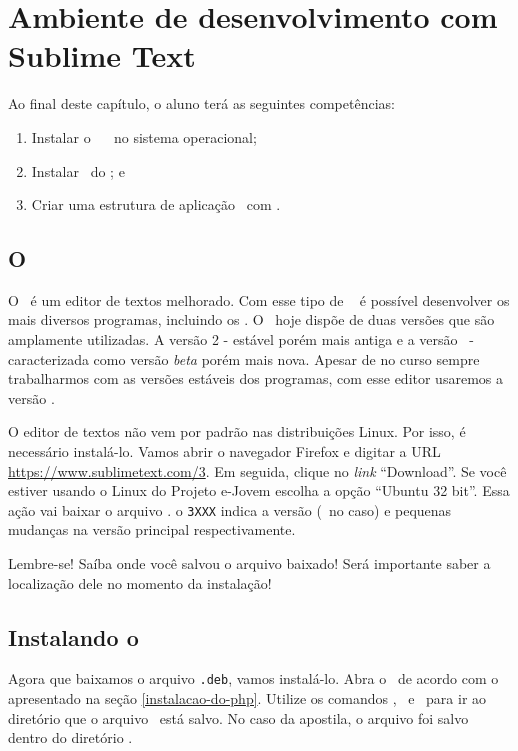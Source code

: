 \chapter{Ambiente de desenvolvimento com Sublime Text}
\label{cap2}

Ao final deste capítulo, o aluno terá as seguintes competências:
\begin{enumerate}
	\item Instalar o \sublime~ \sublimeversao~no sistema operacional;
	\item Instalar \plugins~do \sublime; e
	\item Criar uma estrutura de aplicação \web~com \php. 
\end{enumerate}

\section{O \sublime}
\label{o-sublime}

O \sublime~é um editor de textos melhorado. Com esse tipo de \software~
é possível desenvolver os mais diversos programas, incluindo os \sites. 
O \sublime~hoje dispõe de duas versões que são amplamente utilizadas. 
A versão 2 - estável porém mais antiga e a versão \sublimeversao~- caracterizada como 
versão \textit{beta} porém mais nova. Apesar de no curso sempre trabalharmos com 
as versões estáveis dos programas, com esse editor usaremos a versão \sublimeversao.

O editor de textos não vem por padrão nas distribuições Linux. Por isso, é necessário instalá-lo. 
Vamos abrir o navegador Firefox e digitar a URL \url{https://www.sublimetext.com/3}.
Em seguida, clique no \textit{link} ``Download''. Se você estiver usando o Linux do Projeto e-Jovem
escolha a opção ``Ubuntu 32 bit''. Essa ação vai baixar o arquivo \sublimefilename.
o \texttt{3XXX} indica a versão (\sublimeversao~no caso) e pequenas mudanças na 
versão principal respectivamente.

Lembre-se! Saíba onde você salvou o arquivo baixado! Será importante saber a 
localização dele no momento da instalação!

\section{Instalando o \sublime}
\label{instalando-o-sublime}

Agora que baixamos o arquivo \texttt{.deb}, vamos instalá-lo. Abra o \terminal~de acordo
com o apresentado na seção \ref{instalacao-do-php}. Utilize os comandos \comandocdcompleto, 
\comandolscompleto~e \comandopwdcompleto~para ir ao diretório que o arquivo 
\sublimefilename~está salvo. No caso da apostila, o arquivo foi salvo dentro do 
diretório .

